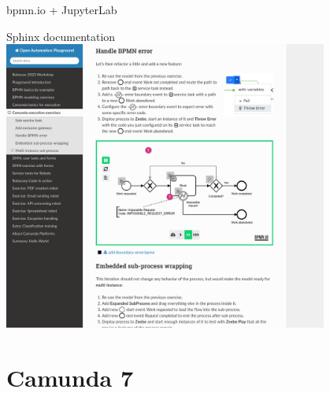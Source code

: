 \documentclass[12pt,aspectratio=169]{beamer}
\begin{document}
\begin{frame}{bpmn.io + JupyterLab}
\begin{minipage}{0.45\textwidth}
\end{minipage}
\end{frame}

\begin{frame}{Sphinx documentation}
\centering
\href{https://datakurre.github.io/automation-playground}{\includegraphics[width=0.8\textwidth]{images/sphinx.png}}
\end{frame}

\section{Camunda 7}

\end{document}
